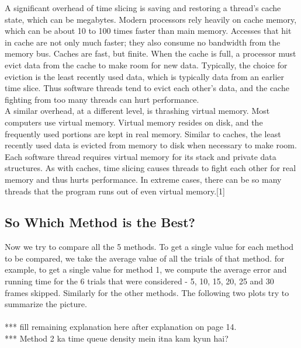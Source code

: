 \documentclass[paper=a4, fontsize = 12pt]{scrartcl}
\numberwithin{equation}{section}		%
\numberwithin{figure}{section}			%
\numberwithin{table}{section}				%
\begin{document}
A significant overhead of time slicing is saving and restoring a thread's cache state, which can be megabytes. Modern processors rely heavily on cache memory, which can be about 10 to 100 times faster than main memory. Accesses that hit in cache are not only much faster; they also consume no bandwidth from the memory bus. Caches are fast, but finite. When the cache is full, a processor must evict data from the cache to make room for new data. Typically, the choice for eviction is the least recently used data, which is typically data from an earlier time slice. Thus software threads tend to evict each other's data, and the cache fighting from too many threads can hurt performance.\\

A similar overhead, at a different level, is thrashing virtual memory. Most computers use virtual memory. Virtual memory resides on disk, and the frequently used portions are kept in real memory. Similar to caches, the least recently used data is evicted from memory to disk when necessary to make room. Each software thread requires virtual memory for its stack and private data structures. As with caches, time slicing causes threads to fight each other for real memory and thus hurts performance. In extreme cases, there can be so many threads that the program runs out of even virtual memory.[1] 

\subsection{So Which Method is the Best?}

Now we try to compare all the 5 methods. To get a single value for each method to be compared, we take the average value of all the trials of that method. for example, to get a single value for method 1, we compute the average error and running time for the 6 trials that were considered - 5, 10, 15, 20, 25 and 30 frames skipped. Similarly for the other methods. The following two plots try to summarize the picture.
\\\\
*** fill remaining explanation here after explanation on page 14.\\
*** Method 2 ka time queue density mein itna kam kyun hai?
\end{document}
